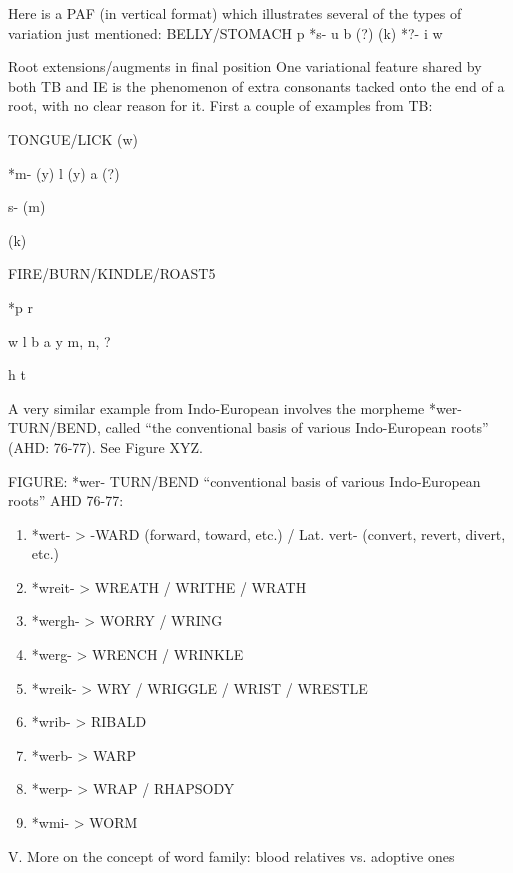 Here is a PAF (in vertical format) which illustrates several of the types of variation just mentioned:
BELLY/STOMACH
			p
		*s-		u
			b		(?)	(k)
		*?-		i
			w
	
 Root extensions/augments in final position
One variational feature shared by both TB and IE is the phenomenon of extra consonants tacked onto the end of a root, with no clear reason for it.  First a couple of examples from TB:

		
TONGUE/LICK
							(w)
	
		*m-
							(y)
			l	(y)	a	(?)	

		  s-					(m)

	
							(k)





FIRE/BURN/KINDLE/ROAST5

			*p			r

				w		l
			 b		a	
				y		m, n, ?
						
			 h			t


A very similar example from Indo-European involves the morpheme *wer- TURN/BEND, called “the conventional basis of various Indo-European roots” (AHD: 76-77). See Figure XYZ.

FIGURE: *wer- TURN/BEND  “conventional basis of various Indo-European roots”  AHD 76-77:

\begin{enumerate}
\item *wert-	>	-WARD	(forward, toward, etc.) / Lat. vert- (convert, revert, divert, etc.)

\item *wreit-	>	WREATH / WRITHE / WRATH

\item *wergh-	>	WORRY / WRING

\item *werg-	>	WRENCH / WRINKLE

\item *wreik-	>	WRY / WRIGGLE / WRIST / WRESTLE

\item *wrib-	>	RIBALD

\item *werb-	>	WARP

\item *werp-	>	WRAP / RHAPSODY

\item *wmi-	>	WORM
\end{enumerate}


V. More on the concept of word family: blood relatives vs. adoptive ones

